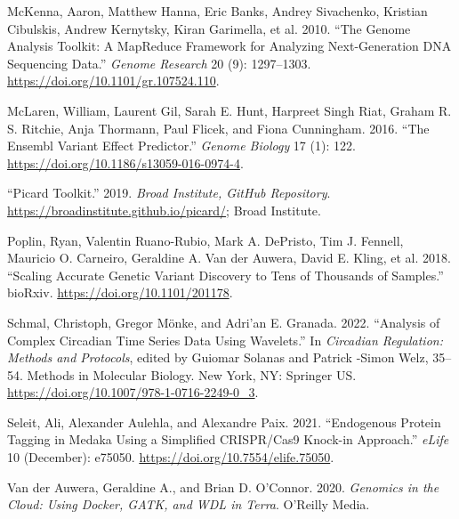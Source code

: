 \documentclass[
]{book}
\newlength{\cslhangindent}
\newlength{\cslentryspacingunit} %
\newenvironment{CSLReferences}[2] %
 {%
  \setlength{\parindent}{0pt}
  \ifodd #1
  \let\oldpar\par
  \def\par{\hangindent=\cslhangindent\oldpar}
  \fi
  \setlength{\parskip}{#2\cslentryspacingunit}
 }%
 {}
\begin{document}
\begin{CSLReferences}{1}{0}
\leavevmode{}%
McKenna, Aaron, Matthew Hanna, Eric Banks, Andrey Sivachenko, Kristian Cibulskis, Andrew Kernytsky, Kiran Garimella, et al. 2010. {``The {Genome Analysis Toolkit}: {A MapReduce} Framework for Analyzing Next-Generation {DNA} Sequencing Data.''} \emph{Genome Research} 20 (9): 1297--1303. \url{https://doi.org/10.1101/gr.107524.110}.

\leavevmode{}%
McLaren, William, Laurent Gil, Sarah E. Hunt, Harpreet Singh Riat, Graham R. S. Ritchie, Anja Thormann, Paul Flicek, and Fiona Cunningham. 2016. {``The {Ensembl Variant Effect Predictor}.''} \emph{Genome Biology} 17 (1): 122. \url{https://doi.org/10.1186/s13059-016-0974-4}.

\leavevmode{}%
{``Picard Toolkit.''} 2019. \emph{Broad Institute, GitHub Repository}. \url{https://broadinstitute.github.io/picard/}; Broad Institute.

\leavevmode{}%
Poplin, Ryan, Valentin Ruano-Rubio, Mark A. DePristo, Tim J. Fennell, Mauricio O. Carneiro, Geraldine A. Van der Auwera, David E. Kling, et al. 2018. {``Scaling Accurate Genetic Variant Discovery to Tens of Thousands of Samples.''} {bioRxiv}. \url{https://doi.org/10.1101/201178}.

\leavevmode{}%
Schmal, Christoph, Gregor Mönke, and Adri'an E. Granada. 2022. {``Analysis of {Complex Circadian Time Series Data Using Wavelets}.''} In \emph{Circadian {Regulation}: {Methods} and {Protocols}}, edited by Guiomar Solanas and Patrick -Simon Welz, 35--54. Methods in {Molecular Biology}. {New York, NY}: {Springer US}. \url{https://doi.org/10.1007/978-1-0716-2249-0_3}.

\leavevmode{}%
Seleit, Ali, Alexander Aulehla, and Alexandre Paix. 2021. {``Endogenous Protein Tagging in Medaka Using a Simplified {CRISPR}/{Cas9} Knock-in Approach.''} \emph{eLife} 10 (December): e75050. \url{https://doi.org/10.7554/elife.75050}.

\leavevmode{}%
Van der Auwera, Geraldine A., and Brian D. O'Connor. 2020. \emph{Genomics in the Cloud: Using {Docker}, {GATK}, and {WDL} in {Terra}}. {O'Reilly Media}.


\end{CSLReferences}
\end{document}

